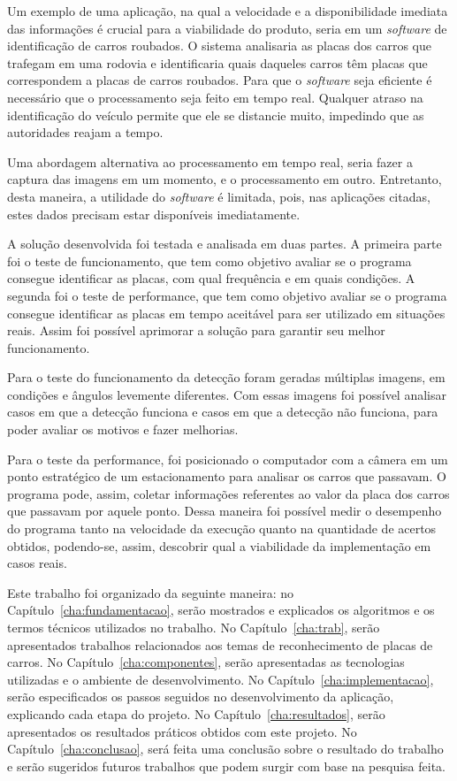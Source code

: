Um exemplo de uma aplicação, na qual a velocidade e a disponibilidade imediata das informações é crucial para a viabilidade do produto, seria em um \emph{software} de identificação de carros roubados. O sistema analisaria as placas dos carros que trafegam em uma rodovia e identificaria quais daqueles carros têm placas que correspondem a placas de carros roubados. Para que o \emph{software} seja eficiente é necessário que o processamento seja feito em tempo real. Qualquer atraso na identificação do veículo permite que ele se distancie muito, impedindo que as autoridades reajam a tempo.

Uma abordagem alternativa ao processamento em tempo real, seria fazer a captura das imagens em um momento, e o processamento em outro. Entretanto, desta maneira, a utilidade do \emph{software} é limitada, pois, nas aplicações citadas, estes dados precisam estar disponíveis imediatamente.

A solução desenvolvida foi testada e analisada em duas partes. A primeira parte foi o teste de funcionamento, que tem como objetivo avaliar se o programa consegue identificar as placas, com qual frequência e em quais condições. A segunda foi o teste de performance, que tem como objetivo avaliar se o programa consegue identificar as placas em tempo aceitável para ser utilizado em situações reais. Assim foi possível aprimorar a solução para garantir seu melhor funcionamento.

Para o teste do funcionamento da detecção foram geradas múltiplas imagens, em condições e ângulos levemente diferentes. Com essas imagens foi possível analisar casos em que a detecção funciona e casos em que a detecção não funciona, para poder avaliar os motivos e fazer melhorias.

Para o teste da performance, foi posicionado o computador com a câmera em um ponto estratégico de um estacionamento para analisar os carros que passavam. O programa pode, assim, coletar informações referentes ao valor da placa dos carros que passavam por aquele ponto. Dessa maneira foi possível medir o desempenho do programa tanto na velocidade da execução quanto na quantidade de acertos obtidos, podendo-se, assim, descobrir qual a viabilidade da implementação em casos reais.

Este trabalho foi organizado da seguinte maneira: no Capítulo~\ref{cha:fundamentacao}, serão mostrados e explicados os algoritmos e os termos técnicos utilizados no trabalho. No Capítulo~\ref{cha:trab},
serão apresentados trabalhos relacionados aos temas de reconhecimento de placas de carros. No Capítulo~\ref{cha:componentes}, serão apresentadas as tecnologias utilizadas e o ambiente de desenvolvimento. No Capítulo~\ref{cha:implementacao}, serão especificados os passos seguidos no desenvolvimento da aplicação, explicando cada etapa do projeto. No Capítulo~\ref{cha:resultados}, serão apresentados os resultados práticos obtidos com este projeto. No Capítulo~\ref{cha:conclusao}, será feita uma conclusão sobre o resultado do trabalho e serão sugeridos futuros trabalhos que podem surgir com base na pesquisa feita.
